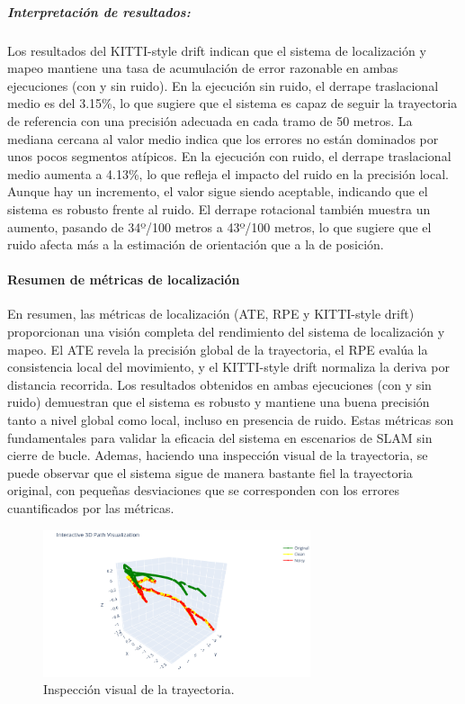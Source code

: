 \documentclass[12pt, a4paper, twoside]{article}
\begin{document}
\subparagraph{Interpretación de resultados:}
Los resultados del KITTI-style drift indican que el sistema de localización y mapeo mantiene
una tasa de acumulación de error razonable en ambas ejecuciones (con y sin ruido).
En la ejecución sin ruido, el derrape traslacional medio es del 3.15\%, lo que sugiere que el sistema es capaz de seguir la trayectoria de referencia con una
precisión adecuada en cada tramo de 50 metros. La mediana cercana al valor medio indica
que los errores no están dominados por unos pocos segmentos atípicos.\newline
En la ejecución con ruido, el derrape traslacional medio aumenta a 4.13\%, lo que refleja el impacto del ruido en la precisión local.
Aunque hay un incremento, el valor sigue siendo aceptable, indicando que el sistema es robusto frente al ruido.
El derrape rotacional también muestra un aumento, pasando de 34º/100 metros a 43º/100 metros, lo que sugiere que el ruido afecta más a la estimación de orientación que
a la de posición.\newline

\paragraph{Resumen de métricas de localización}
En resumen, las métricas de localización (ATE, RPE y KITTI-style drift) proporcionan una visión completa del rendimiento del sistema de localización y mapeo.
El ATE revela la precisión global de la trayectoria, el RPE evalúa la consistencia local del movimiento, y el KITTI-style drift normaliza la deriva por distancia recorrida.
Los resultados obtenidos en ambas ejecuciones (con y sin ruido) demuestran que el sistema es robusto y mantiene una buena precisión tanto a nivel global como local, incluso en presencia de ruido.
Estas métricas son fundamentales para validar la eficacia del sistema en escenarios de SLAM sin cierre de bucle. Ademas, haciendo una inspección visual de la trayectoria, se puede observar que el sistema sigue de manera bastante fiel la trayectoria original,
con pequeñas desviaciones que se corresponden con los errores cuantificados por las métricas.

\begin{figure}[h]
  \centering
    \includegraphics[width=0.7\textwidth]{full_path.png}
  \caption{Inspección visual de la trayectoria.}
\end{figure} 
\end{document}
